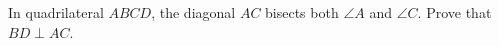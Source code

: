 In quadrilateral $ABCD$, the diagonal $AC$ bisects both $\angle A$ and $\angle C$. Prove that $BD\perp AC$.
